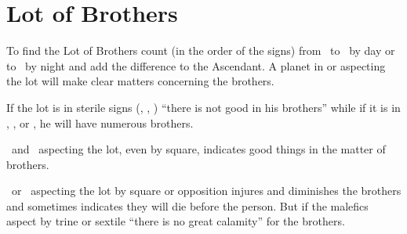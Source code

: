 \section{Lot of Brothers}

To find the Lot of Brothers count (in the order of the signs) from \Saturn\, to \Jupiter\, by day or \Jupiter\, to \Saturn\, by night and add the difference to the Ascendant. A planet in or aspecting the lot will make clear matters concerning the brothers.

If the lot is in sterile signs (\Leo, \Virgo, \Capricorn) ``there is not good in his brothers'' while if it is in \Cancer, \Scorpio, or \Pisces, he will have numerous brothers.

\Jupiter\, and \Venus\, aspecting the lot, even by square, indicates good things in the matter of brothers.

\Mars\, or \Saturn\, aspecting the lot by square or opposition injures and diminishes the brothers and sometimes indicates they will die before the person. But if the malefics aspect by trine or sextile ``there is no great calamity'' for the brothers.





